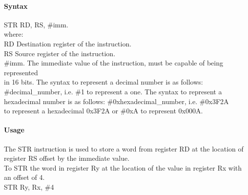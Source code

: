 \documentclass[12pt]{article}
\begin{document}
    \paragraph{Syntax}
    \begin{flushleft}
    STR RD, RS, \#imm.\\
    \vspace{1em}        %
    where:\\
    \vspace{1em}
    RD  \hspace{3.6em} Destination register of the instruction.\\
    \vspace{1em}
    RS  \hspace{3.85em} Source register of the instruction.\\
    \vspace{1em}
    \#imm.  \hspace{1.8em} The immediate value of the instruction, must be capable of being represented\\             \hspace{5.4em} in 16 bits. The syntax to represent a decimal number is as follows:\\
            \hspace{5.4em} \#decimal\_number, i.e. \#1 to represent a one. The syntax to represent a\\
            \hspace{5.4em} hexadecimal number is as follows: \#0xhexadecimal\_number, i.e. \#0x3F2A \\
            \hspace{5.4em} to represent a hexadecimal 0x3F2A or \#0xA to represent 0x000A.\\
    \end{flushleft}
    
    \paragraph{Usage}
    \begin{flushleft}
    The STR instruction is used to store a word from register RD at the location of register RS offset by the immediate value.\\    
    \vspace{1em}
    To STR the word in register Ry at the location of the value in register Rx with an offset of 4.\\
    \vspace{1em}
    STR Ry, Rx, \#4
    \end{flushleft}
    
\end{document}
